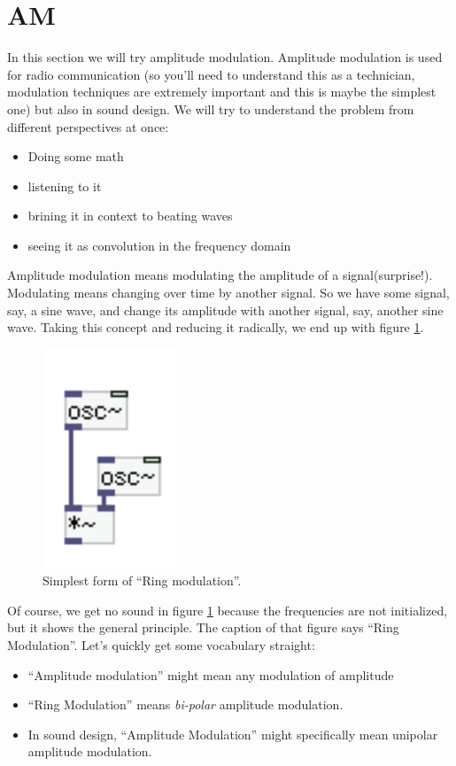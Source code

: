 \section{AM} %
\label{sub:AM}
In this section we will try amplitude modulation. Amplitude modulation is used for radio communication (so you'll need to understand this as a technician, modulation techniques are extremely important and this is maybe the simplest one) but also in sound design. We will try to understand the problem from different perspectives at once:
\begin{itemize}
	\item Doing some math
	\item listening to it
	\item brining it in context to beating waves
	\item seeing it as convolution in the frequency domain
\end{itemize}

Amplitude modulation means modulating the amplitude of a signal(surprise!). Modulating means changing over time by another signal. So we have some signal, say, a sine wave, and change its amplitude with another signal, say, another sine wave. Taking this concept and reducing it radically, we end up with figure \ref{fig:simpleAM}.

\begin{figure}[H]
	\begin{center}
		\includegraphics[width = 4cm]{img/ringNaive.png}
		\caption{Simplest form of ``Ring modulation''.}
		\label{fig:simpleAM}
	\end{center}
\end{figure}
Of course, we get no sound in figure \ref{fig:simpleAM} because the frequencies are not initialized, but it shows the general principle. The caption of that figure says ``Ring Modulation''. Let's quickly get some vocabulary straight:\\
\begin{itemize}
	\item ``Amplitude modulation'' might mean any modulation of amplitude
	\item ``Ring Modulation'' means \textit{bi-polar} amplitude modulation.
	\item In sound design, ``Amplitude Modulation'' might specifically mean unipolar amplitude modulation.
\end{itemize}

